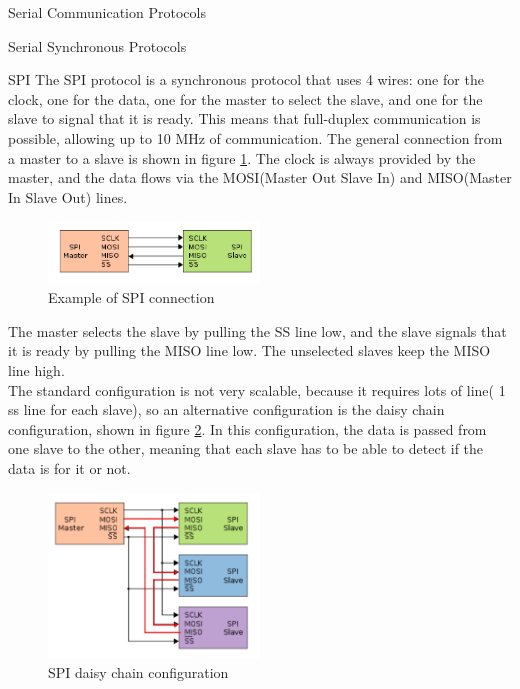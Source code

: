 \begin{section}{Serial Communication Protocols}
\begin{subsection}{Serial Synchronous Protocols}
    \begin{subsubsection}{SPI}
      The SPI protocol is a synchronous protocol that uses 4 wires: one for the clock, one for the
      data, one for the master to select the slave, and one for the slave to signal that it is ready.
      This means that full-duplex communication is possible, allowing up to 10 MHz of communication.
      The general connection from a master to a slave is shown in figure \ref{fig:spi-connection}.
      The clock is always provided by the master, and the data flows via the MOSI(Master Out Slave
      In) and MISO(Master In Slave Out) lines.\\

      \begin{figure}[H]
        \centering
        \includegraphics[width=0.5\textwidth]{img/hardware/spi connection.png}
        \caption{Example of SPI connection}
        \label{fig:spi-connection}
      \end{figure}
      The master selects the slave by pulling the SS line low, and the slave signals that it is
      ready by pulling the MISO line low. The unselected slaves keep the MISO line high.\\
      The standard configuration is not very scalable, because it requires lots of line( 1 ss line 
      for each slave), so an alternative configuration is the daisy chain configuration, shown in
      figure \ref{fig:spi-daisy-chain}. In this configuration, the data is passed from one slave to 
      the other, meaning that each slave has to be able to detect if the data is for it or not.
      \begin{figure}[H]
        \centering
        \includegraphics[width=0.5\textwidth]{img/hardware/spi daisy chain.png}
        \caption{SPI daisy chain configuration}
        \label{fig:spi-daisy-chain}
      \end{figure}
    \end{subsubsection}


\end{subsection}
\end{section}
